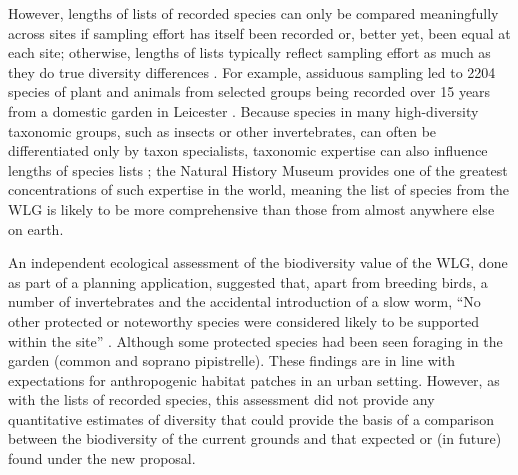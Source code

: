 However, lengths of lists of recorded species can only be compared meaningfully across sites if sampling effort has itself been recorded or, better yet, been equal at each site; otherwise, lengths of lists typically reflect sampling effort as much as they do true diversity differences \citep{Gotelli:2001el,Crawley:2005flora}. For example, assiduous sampling led to 2204 species of plant and animals from selected groups being recorded over 15 years from a domestic garden in Leicester \citep{Owen:1991ecology}. Because species in many high-diversity taxonomic groups, such as insects or other invertebrates, can often be differentiated only by taxon specialists, taxonomic expertise can also influence lengths of species lists \citep{Crawley:2005flora}; the Natural History Museum provides one of the greatest concentrations of such expertise in the world, meaning the list of species from the WLG is likely to be more comprehensive than those from almost anywhere else on earth.

An independent ecological assessment of the biodiversity value of the WLG, done as part of a planning application, suggested that, apart from breeding birds, a number of invertebrates and the accidental introduction of a slow worm, ``No other protected or noteworthy species were considered likely to be supported within the site'' \citep{PrelimEcoAppraisal:2015cf, ImpactAssessment:2015cf}. Although some protected species had been seen foraging in the garden (common and soprano pipistrelle). These findings are in line with expectations for anthropogenic habitat patches in an urban setting. However, as with the lists of recorded species, this assessment did not provide any quantitative estimates of diversity that could provide the basis of a comparison between the biodiversity of the current grounds and that expected or (in future) found under the new proposal.


